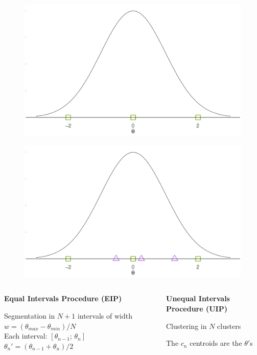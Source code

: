 \documentclass[aspectratio=149, compress]{beamer}
\begin{document}
\begin{frame}
	\vspace*{-3mm}
	\begin{overprint}
		\begin{figure}
			\centering
			\includegraphics[width=.50\linewidth]{img/eip}
		\end{figure}
		\begin{figure}
			\centering
			\includegraphics[width=.50\linewidth]{img/latent}
		\end{figure}
	\end{overprint}
	\begin{columns}[T]
		\begin{column}{.50\linewidth}
			\begin{center}
				\small
				\textbf{\textcolor{eip}{Equal Intervals Procedure (EIP)}}
			\end{center} \small	Segmentation in $N + 1$ intervals of width $w = (\theta_{max} - \theta_{min}) / N$ \\
			\vspace{2mm}
			Each interval: $[\theta_{n-1}; \,\theta_{n}]$ \\
			\vspace{2mm}
			$\theta_n' = (\theta_{n-1} + \theta_{n})/2$ 
			
		\end{column}
		\begin{column}{.50\linewidth}
			
			\begin{center}
				\small
				\textbf{\textcolor{uip}{Unequal Intervals Procedure (UIP)}} 
			\end{center}
			
			\small
			Clustering in $N$ clusters  	
			
			\vspace{2mm}
			The $c_n$ centroids are the $\theta'$s
		\end{column}
	\end{columns}
	
\end{frame}
\end{document}
